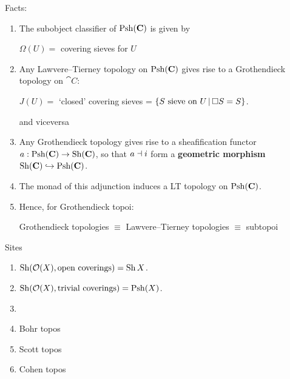 \begin{frame}
	Facts:
	\begin{enumerate}
		\item The subobject classifier of $\operatorname{Psh}(\mathbf{C})$ is given by
		\begin{center}
			$\Omega(U) =$ covering sieves for $U$
		\end{center}
		\item Any Lawvere--Tierney topology on $\operatorname{Psh}(\mathbf{C})$ gives rise to a Grothendieck topology on $\cat C$:
		\begin{center}
			$J(U) =$ `closed' covering sieves = $\{ \text{$S$ sieve on $U$} \,|\, \text{$\square S = S$}\}$.
		\end{center}
		and viceversa
		\item Any Grothendieck topology gives rise to a sheafification functor $a:\operatorname{Psh}(\mathbf{C}) \to \operatorname{Sh}(\mathbf{C})$, so that $a \dashv i$ form a \textbf{geometric morphism} $\operatorname{Sh}(\mathbf{C}) \hookrightarrow \operatorname{Psh}(\mathbf{C})$.
		\item The monad of this adjunction induces a LT topology on $\operatorname{Psh}(\mathbf{C})$.
		\item Hence, for Grothendieck topoi:
		\begin{center}
			Grothendieck topologies $\equiv$ Lawvere--Tierney topologies $\equiv$ subtopoi
		\end{center}
	\end{enumerate}
\end{frame}

\begin{frame}{Sites}
	\begin{example}
		\begin{enumerate}
			\item<1-> $\operatorname{Sh}(\mathcal{O}(X), \text{open coverings}) = \operatorname{Sh} X$.
			\item<2-> $\operatorname{Sh}(\mathcal{O}(X), \text{trivial coverings}) = \operatorname{Psh}(X)$.
			\item<3->
			\item Bohr topos
			\item Scott topos
			\item Cohen topos
		\end{enumerate}
	\end{example}
\end{frame}
